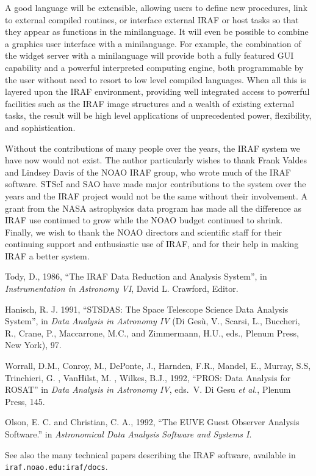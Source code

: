 A good language will be extensible, allowing users to define new procedures,
link to external compiled routines, or interface external IRAF or host tasks
so that they appear as functions in the minilanguage.  It will even be
possible to combine a graphics user interface with a minilanguage.  For
example, the combination of the widget server with a minilanguage will
provide both a fully featured GUI capability and a powerful interpreted
computing engine, both programmable by the user without need to resort to
low level compiled languages.  When all this is layered upon the IRAF
environment, providing well integrated access to powerful facilities such as
the IRAF image structures and a wealth of existing external tasks, the
result will be high level applications of unprecedented power, flexibility,
and sophistication.

\vspace{12pt}
\acknowledgments

Without the contributions of many people over the years, the IRAF system we
have now would not exist.  The author particularly wishes to thank Frank
Valdes and Lindsey Davis of the NOAO IRAF group, who wrote much of the IRAF
software.  STScI and SAO have made major contributions to the system over
the years and the IRAF project would not be the same without their
involvement.  A grant from the NASA astrophysics data program has made all
the difference as IRAF use continued to grow while the NOAO budget continued
to shrink.  Finally, we wish to thank the NOAO directors and scientific
staff for their continuing support and enthusiastic use of IRAF, and for
their help in making IRAF a better system.

\begin{references}
 Tody, D., 1986, ``The IRAF Data Reduction and Analysis System'',
in {\it Instrumentation in Astronomy VI}, David L. Crawford, Editor.

Hanisch, R. J. 1991,
``STSDAS:  The Space Telescope Science Data Analysis System'',
in {\it Data Analysis in Astronomy IV} (Di Ges\`{u}, V.,
Scarsi, L., Buccheri, R., Crane, P., Maccarrone, M.C., and Zimmermann, H.U.,
eds., Plenum Press, New York), 97.

Worrall, D.M., Conroy, M., DePonte, J., Harnden, F.R., Mandel, E.,
Murray, S.S, Trinchieri, G. , VanHilst, M. , Wilkes, B.J., 1992,
``PROS: Data Analysis for ROSAT''
in {\it Data Analysis in Astronomy IV}, eds.~V. Di Gesu {\it et al.},
Plenum Press, 145.

 Olson, E. C. and Christian, C. A., 1992,
``The EUVE Guest Observer Analysis Software.''
in {\it Astronomical Data Analysis Software and Systems I}.

 See also the many technical papers describing the IRAF software,
available in {\tt iraf.noao.edu:iraf/docs}.

\end{references}


